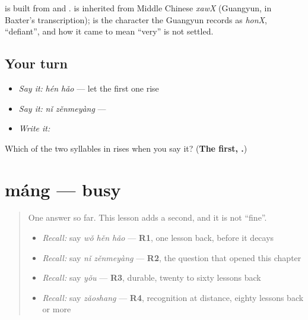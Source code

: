 \begin{cousinweb}
\textbf{} is built from  and .  is inherited from Middle Chinese \emph{xawX} (Guangyun, in Baxter's transcription);  is the character the Guangyun records as \emph{honX}, \textquotedblleft{}defiant\textquotedblright{}, and how it came to mean \textquotedblleft{}very\textquotedblright{} is not settled.
\end{cousinweb}

\subsection*{Your turn}
\begin{itemize}
\raggedright
  \item \emph{Say it:} \emph{hén hǎo} — let the first one rise
  \item \emph{Say it:} \emph{nǐ zěnmeyàng} — 
  \item \emph{Write it:} 
\end{itemize}

\begin{tcolorbox}[breakable,colback=teal!4,colframe=teal!35!black,title={Before you move on}]
Which of the two syllables in  rises when you say it? (\textbf{The first, .})
\end{tcolorbox}
\section[máng]{máng — busy}

\label{lesson:ZH-C30-mang}



\begin{quote}
One answer so far. This lesson adds a second, and it is not \textquotedblleft{}fine\textquotedblright{}.

\begin{itemize}
\raggedright
  \item \emph{Recall:} say \emph{wǒ hěn hǎo} — \textbf{R1}, one lesson back, before it decays
  \item \emph{Recall:} say \emph{nǐ zěnmeyàng} — \textbf{R2}, the question that opened this chapter
  \item \emph{Recall:} say \emph{yǒu} — \textbf{R3}, durable, twenty to sixty lessons back
  \item \emph{Recall:} say \emph{zǎoshang} — \textbf{R4}, recognition at distance, eighty lessons back or more
\end{itemize}
\end{quote}

